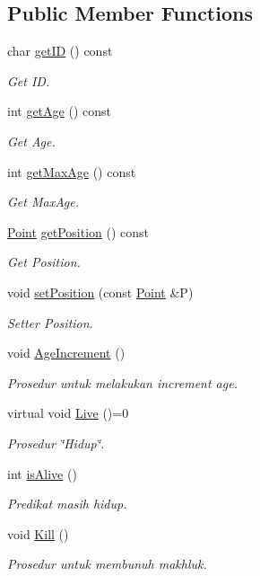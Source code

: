 \subsection*{Public Member Functions}
\begin{DoxyCompactItemize}
\item 
char \hyperlink{class_makhluk_ac1c4f42107c702ba928188fa2530c5f3}{get\+ID} () const 
\begin{DoxyCompactList}\small\item\em Get ID. \end{DoxyCompactList}\item 
int \hyperlink{class_makhluk_aba388ab8fe2eafcda3495d16b7c9e4b7}{get\+Age} () const 
\begin{DoxyCompactList}\small\item\em Get Age. \end{DoxyCompactList}\item 
int \hyperlink{class_makhluk_ae002b2faad22dc950a3f42bd62ea54d9}{get\+Max\+Age} () const 
\begin{DoxyCompactList}\small\item\em Get Max\+Age. \end{DoxyCompactList}\item 
\hyperlink{class_point}{Point} \hyperlink{class_makhluk_a451445ffca2c8c3e45800b7096e65239}{get\+Position} () const 
\begin{DoxyCompactList}\small\item\em Get Position. \end{DoxyCompactList}\item 
void \hyperlink{class_makhluk_a7abec2f20a8c601ec6042682264a7f64}{set\+Position} (const \hyperlink{class_point}{Point} \&P)
\begin{DoxyCompactList}\small\item\em Setter Position. \end{DoxyCompactList}\item 
void \hyperlink{class_makhluk_acc91fe44461c88b854187c7d57f7bb21}{Age\+Increment} ()
\begin{DoxyCompactList}\small\item\em Prosedur untuk melakukan increment age. \end{DoxyCompactList}\item 
virtual void \hyperlink{class_makhluk_af0cc274cef5058743f6b048a78843bd1}{Live} ()=0
\begin{DoxyCompactList}\small\item\em Prosedur \char`\"{}\+Hidup\char`\"{}. \end{DoxyCompactList}\item 
int \hyperlink{class_makhluk_a1677bd235210d490951fcd8a5653160d}{is\+Alive} ()
\begin{DoxyCompactList}\small\item\em Predikat masih hidup. \end{DoxyCompactList}\item 
void \hyperlink{class_makhluk_a8031caebf761dbc200430c24726ca339}{Kill} ()
\begin{DoxyCompactList}\small\item\em Prosedur untuk membunuh makhluk. \end{DoxyCompactList}\end{DoxyCompactItemize}
